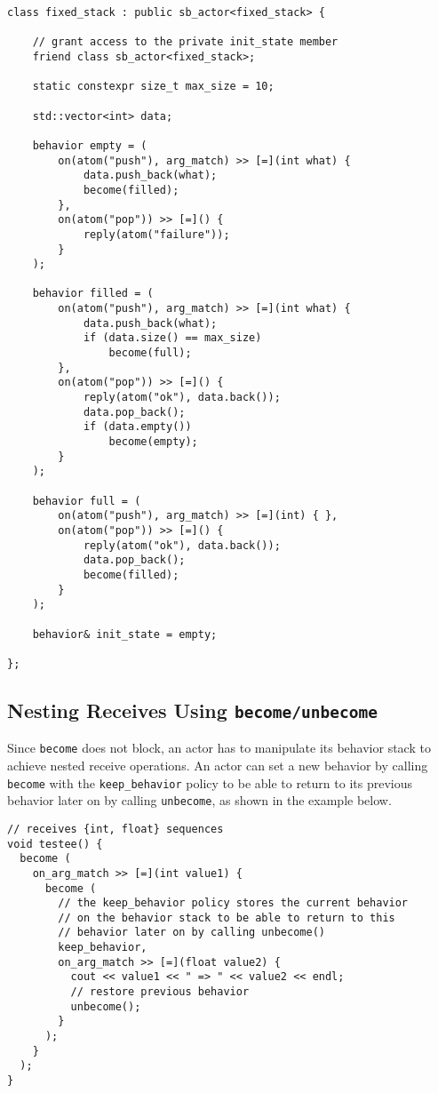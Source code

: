 \clearpage
\begin{lstlisting}
class fixed_stack : public sb_actor<fixed_stack> {

	// grant access to the private init_state member
    friend class sb_actor<fixed_stack>;

    static constexpr size_t max_size = 10;

    std::vector<int> data;

    behavior empty = (
        on(atom("push"), arg_match) >> [=](int what) {
            data.push_back(what);
            become(filled);
        },
        on(atom("pop")) >> [=]() {
            reply(atom("failure"));
        }
    );

    behavior filled = (
        on(atom("push"), arg_match) >> [=](int what) {
            data.push_back(what);
            if (data.size() == max_size)
                become(full);
        },
        on(atom("pop")) >> [=]() {
            reply(atom("ok"), data.back());
            data.pop_back();
            if (data.empty())
                become(empty);
        }
    );

    behavior full = (
        on(atom("push"), arg_match) >> [=](int) { },
        on(atom("pop")) >> [=]() {
            reply(atom("ok"), data.back());
            data.pop_back();
            become(filled);
        }
    );

    behavior& init_state = empty;

};
\end{lstlisting}

\clearpage
\subsection{Nesting Receives Using \lstinline^become/unbecome^}

Since \lstinline^become^ does not block, an actor has to manipulate its behavior stack to achieve nested receive operations.
An actor can set a new behavior by calling \lstinline^become^ with the \lstinline^keep_behavior^ policy to be able to return to its previous behavior later on by calling \lstinline^unbecome^, as shown in the example below.

\begin{lstlisting}
// receives {int, float} sequences
void testee() {
  become (
    on_arg_match >> [=](int value1) {
      become (
        // the keep_behavior policy stores the current behavior
        // on the behavior stack to be able to return to this
        // behavior later on by calling unbecome()
        keep_behavior,
        on_arg_match >> [=](float value2) {
          cout << value1 << " => " << value2 << endl;
          // restore previous behavior
          unbecome();
        }
      );
    }
  );
}
\end{lstlisting}

